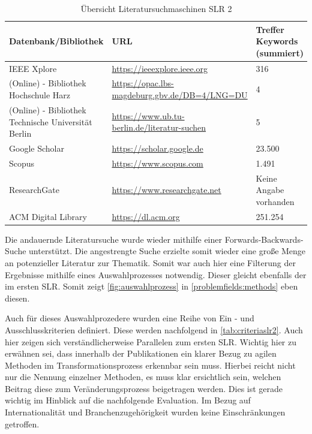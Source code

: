 \begin{table}[ht]
	\centering
	\caption{Übersicht Literatursuchmaschinen SLR 2}
	\begin{tabular}{|p{5cm}|p{7cm}||p{3cm}|}
		\hline
		\textbf{Datenbank/Bibliothek}& \textbf{URL} &  \textbf{Treffer Keywords  (summiert)} \\
		\hline
		IEEE Xplore & \url{https://ieeexplore.ieee.org} & 316 \\
		(Online) - Bibliothek Hochschule Harz & \url{https://opac.lbs-magdeburg.gbv.de/DB=4/LNG=DU} & 4 \\
		(Online) - Bibliothek Technische Universität Berlin  & \url{https://www.ub.tu-berlin.de/literatur-suchen}& 5 \\
		Google Scholar &  \url{https://scholar.google.de}  & 23.500 \\
		Scopus & \url{https://www.scopus.com} & 1.491 \\
		ResearchGate & \url{https://www.researchgate.net} &Keine Angabe vorhanden \\ 
		ACM Digital Library & \url{https://dl.acm.org} & 251.254 \\
		\hline
	\end{tabular}
	\label{tab:suchmaschinenslr2}
\end{table}

Die andauernde Literatursuche wurde wieder mithilfe einer Forwards-Backwards-Suche unterstützt. Die angestrengte Suche erzielte somit wieder eine große Menge an potenzieller Literatur zur Thematik. Somit war auch hier eine Filterung der Ergebnisse mithilfe eines Auswahlprozesses notwendig. Dieser gleicht ebenfalls der im ersten SLR. Somit zeigt \ref{fig:auswahlprozess} in \ref{problemfields:methods} eben diesen. 

Auch für dieses Auswahlprozedere wurden eine Reihe von Ein - und Ausschlusskriterien definiert. Diese werden nachfolgend in \ref{tab:criteriaslr2}. Auch hier zeigen sich verständlicherweise Parallelen zum ersten SLR. Wichtig hier zu erwähnen sei, dass innerhalb der Publikationen ein klarer Bezug zu agilen Methoden im Transformationsprozess erkennbar sein muss. Hierbei reicht nicht nur die Nennung einzelner Methoden, es muss klar ersichtlich sein, welchen Beitrag diese zum Veränderungsprozess beigetragen werden. Dies ist gerade wichtig im Hinblick auf die nachfolgende Evaluation. Im Bezug auf Internationalität und Branchenzugehörigkeit wurden keine Einschränkungen getroffen.

